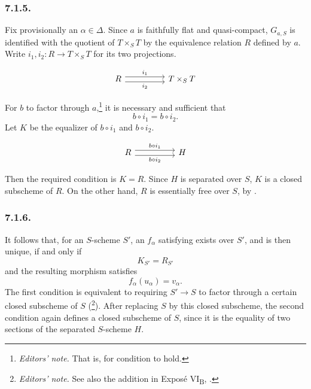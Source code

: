 \subsubsection*{7.1.5.}

Fix provisionally an \(\alpha\in\Delta\). Since \(a\) is faithfully
flat and quasi-compact, \(G_{a,S}\) is identified with the quotient of
\(T\times_S T\) by the equivalence relation \(R\) defined by \(a\).
Write \(i_1,i_2:R\to T\times_S T\) for its two projections.

\[
\begin{tikzcd}[column sep=huge]
R
  \arrow[r,shift left=.7ex,"i_1"]
  \arrow[r,shift right=.7ex,"i_2"']
&
T\times_S T
\end{tikzcd}


\]

For \(b\) to factor through \(a\),\footnote{\textit{Editors' note.}
That is, for condition  to hold.} it is necessary and
sufficient that
\[
  b\circ i_1=b\circ i_2.
\]
Let \(K\) be the equalizer of \(b\circ i_1\) and \(b\circ i_2\).

\[
\begin{tikzcd}[column sep=huge]
R
  \arrow[r,shift left=.7ex,"b\circ i_1"]
  \arrow[r,shift right=.7ex,"b\circ i_2"']
&
H
\end{tikzcd}


\]

Then the required condition is \(K=R\). Since \(H\) is separated over
\(S\), \(K\) is a closed subscheme of \(R\). On the other hand,
\(R\) is essentially free over \(S\), by .

\subsubsection*{7.1.6.}

It follows that, for an \(S\)-scheme \(S'\), an \(f_\alpha\) satisfying
 exists over \(S'\), and is then unique, if and only if
\[
  K_{S'}=R_{S'}
\]
and the resulting morphism satisfies
\[
  f_\alpha(u_\alpha)=v_\alpha.
\]
The first condition is equivalent to requiring \(S'\to S\) to factor
through a certain closed subscheme of \(S\) (\footnote{\textit{Editors' note.} See also the addition in Exposé
VI\textsubscript{B}, .}). After replacing \(S\) by this closed
subscheme, the second condition again defines a closed subscheme of
\(S\), since it is the equality of two sections of the separated
\(S\)-scheme \(H\).


